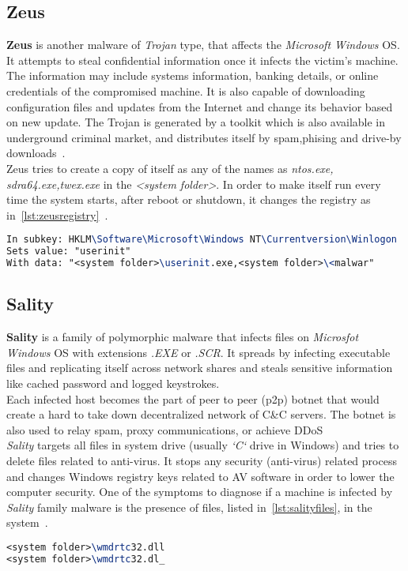 \subsection{Zeus}
\label{sub:Zeus}
\textbf{Zeus} is another malware of \emph{Trojan} type, that affects the \emph{Microsoft Windows} OS\@.
It attempts to steal confidential information once it infects the victim's machine.
The information may include systems information, banking details, or online credentials of the compromised machine.
It is also capable of downloading configuration files and updates from the Internet and change its behavior based on new update.
The Trojan is generated by a toolkit which is also available in underground criminal market, and distributes itself by spam,phising and drive-by downloads~\cite[Trojan.Zbot]{zeus}.\\
Zeus tries to create a copy of itself as any of the names as \emph{ntos.exe, sdra64.exe,twex.exe} in the \textit{<system folder>}.
In order to make itself run every time the system starts, after reboot or shutdown, it changes the registry as in~\autoref{lst:zeusregistry}~\cite[Win32/Zbot]{zeusmicro}.
\begin{lstlisting}[language=TeX,caption={Registry key modified by Zeus Trojan to autostart},label={lst:zeusregistry}]
In subkey: HKLM\Software\Microsoft\Windows NT\Currentversion\Winlogon
Sets value: "userinit"
With data: "<system folder>\userinit.exe,<system folder>\<malwar"
\end{lstlisting}
\subsection{Sality}
\label{sub:Sality}
\textbf{Sality} is a family of polymorphic malware that infects files on \emph{Microsfot Windows} OS with extensions \emph{.EXE} or \emph{.SCR}.
It spreads by infecting executable files and replicating itself across network shares and steals sensitive information like cached password and logged keystrokes.\\
Each infected host becomes the part of peer to peer (p2p) botnet that would create a hard to take down decentralized network of C\&C servers.
The botnet is also used to relay spam, proxy communications, or achieve DDoS~\cite[Sality]{salitysym}\\
\emph{Sality} targets all files in system drive (usually \emph{`C`} drive in Windows) and tries to delete files related to anti-virus.
It stops any security (anti-virus) related process  and changes Windows registry keys related to AV software in order to lower the computer security.
One of the symptoms to diagnose if a machine is infected by \emph{Sality} family malware is the presence of files, listed in~\autoref{lst:salityfiles}, in the system~\cite[Win32/Sality]{salitymicro}.
\begin{lstlisting}[language=TeX,caption={Files created by Sality in the infected machine},label={lst:salityfiles}]
<system folder>\wmdrtc32.dll
<system folder>\wmdrtc32.dl_
\end{lstlisting}

